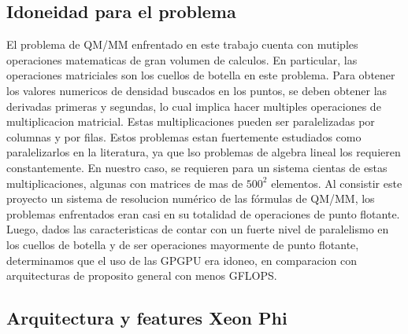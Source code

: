 \subsection{Idoneidad para el problema}
El problema de QM/MM enfrentado en este trabajo cuenta con mutiples operaciones matematicas de gran
volumen de calculos. En particular, las operaciones matriciales son los cuellos de botella en este
problema. 
Para obtener los valores numericos de densidad buscados en los puntos, se deben obtener las derivadas primeras
y segundas, lo cual implica hacer multiples operaciones de multiplicacion matricial. Estas multiplicaciones
pueden ser paralelizadas por columnas y por filas. Estos problemas estan fuertemente estudiados como paralelizarlos
en la literatura, ya que lso problemas de algebra lineal los requieren constantemente. 
En nuestro caso, se requieren para un sistema cientas de estas multiplicaciones, algunas con matrices de mas de
$500^2$ elementos. Al consistir este proyecto un sistema de resolucion num\'erico de las f\'ormulas de QM/MM,
los problemas enfrentados eran casi en su totalidad de operaciones de punto flotante. Luego, dados las
caracteristicas de contar con un fuerte nivel de paralelismo en los cuellos de botella y de ser operaciones
mayormente de punto flotante, determinamos que el uso de las GPGPU era idoneo, en comparacion con arquitecturas
de proposito general con menos GFLOPS.

\subsection{Arquitectura y features Xeon Phi}


